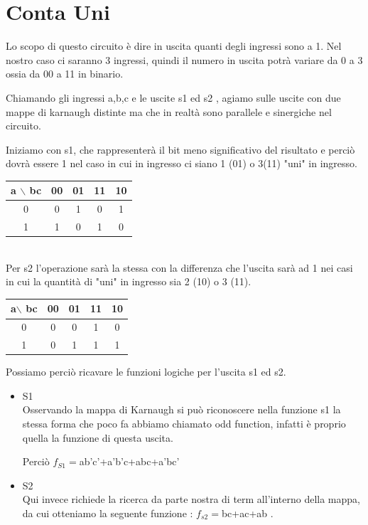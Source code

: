 \documentclass[a4paper]{book}
\begin{document}
\section{Conta Uni}

Lo scopo di questo circuito è dire in uscita quanti degli ingressi sono a 1. Nel nostro caso ci saranno 3 ingressi, quindi il numero in uscita potrà variare da 0 a 3 ossia da 00 a 11 in binario.


Chiamando gli ingressi a,b,c e le uscite s1 ed s2 , agiamo sulle uscite con due mappe di karnaugh distinte ma che in realtà sono parallele e sinergiche nel circuito.


Iniziamo con s1, che rappresenterà il bit meno significativo del risultato e perciò dovrà essere 1 nel caso in cui in ingresso ci siano 1 (01) o 3(11) "uni" in ingresso.

\vspace{\baselineskip}
\begin{tabular}{|c|c|c|c|c|}
\hline
a $\backslash$ bc & 00 & 01 & 11 & 10 \\
\hline
0              & 0  & {\cellcolor{yellow} 1 } &  0 & {\cellcolor{yellow}1}  \\
\hline
1             & {\cellcolor{yellow}1}  & 0  &  {\cellcolor{yellow}1} & 0  \\
\hline
\end{tabular}
\\ \vspace{\baselineskip}
Per s2 l'operazione sarà la stessa con la differenza che l'uscita sarà ad 1 nei casi in cui la quantità di "uni" in ingresso sia 2 (10) o 3 (11).
\\\vspace{\baselineskip}
\begin{tabular}{|c|c|c|c|c|}
\hline
a$\backslash$ bc & 00 & 01 & 11 & 10 \\
\hline
0              & 0  & 0  &  \cellcolor{yellow}1 & 0  \\
\hline
1              & 0  & \cellcolor{yellow}1  &  \cellcolor{yellow}1 & \cellcolor{yellow}1  \\
\hline
\end{tabular}




Possiamo perciò ricavare le funzioni logiche per l'uscita s1 ed s2.

\begin{itemize}
\item{S1} \\ Osservando la mappa di Karnaugh si può riconoscere nella funzione s1 la stessa forma che poco fa abbiamo chiamato odd function, infatti è proprio quella la funzione di questa uscita.

Perciò \(f_{S1}=\)ab'c'+a'b'c+abc+a'bc'

\item{S2} \\ Qui invece richiede la ricerca da parte nostra di term all'interno della mappa, da cui otteniamo la seguente funzione : \(f_{s2}=\)bc+ac+ab .
\end{itemize}
\end{document}
